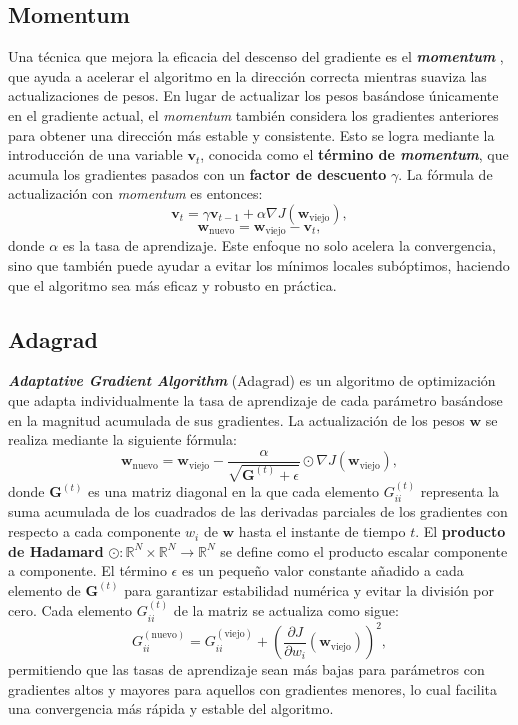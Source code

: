 \subsection{Momentum}

Una técnica que mejora la eficacia del descenso del gradiente es el \textbf{\textit{momentum}} \cite{rumelhart1986learning}, que ayuda a acelerar el algoritmo en la dirección correcta mientras suaviza las actualizaciones de pesos. En lugar de actualizar los pesos basándose únicamente en el gradiente actual, el \textit{momentum} también considera los gradientes anteriores para obtener una dirección más estable y consistente. Esto se logra mediante la introducción de una variable \(\mathbf{v}_t\), conocida como el \textbf{término de \textit{momentum}}, que acumula los gradientes pasados con un \textbf{factor de descuento} \(\gamma\). La fórmula de actualización con \textit{momentum} es entonces:
\begin{equation}
	\mathbf{v}_{t} = \gamma \mathbf{v}_{t-1} + \alpha \nabla J(\mathbf{w}_{\text{viejo}}),
\end{equation}
\begin{equation}
	\mathbf{w}_{\text{nuevo}} = \mathbf{w}_{\text{viejo}} - \mathbf{v}_{t},
\end{equation}
donde \(\alpha\) es la tasa de aprendizaje. Este enfoque no solo acelera la convergencia, sino que también puede ayudar a evitar los mínimos locales subóptimos, haciendo que el algoritmo sea más eficaz y robusto en práctica.


\subsection{Adagrad}

\textbf{\textit{Adaptative Gradient Algorithm}} (Adagrad) \cite{duchi2011adaptive} es un algoritmo de optimización que adapta individualmente la tasa de aprendizaje de cada parámetro basándose en la magnitud acumulada de sus gradientes. La actualización de los pesos \(\mathbf{w}\) se realiza mediante la siguiente fórmula:
\[
\mathbf{w}_{\text{nuevo}} = \mathbf{w}_{\text{viejo}} - \frac{\alpha}{\sqrt{\mathbf{G}^{(t)} + \epsilon}} \odot \nabla J(\mathbf{w}_{\text{viejo}}),
\]
donde \( \mathbf{G}^{(t)} \) es una matriz diagonal en la que cada elemento \( G_{ii}^{(t)} \) representa la suma acumulada de los cuadrados de las derivadas parciales de los gradientes con respecto a cada componente \( w_i \) de \(\mathbf{w}\) hasta el instante de tiempo \(t\). El \textbf{producto de Hadamard} \(\odot : \mathbb{R}^N \times \mathbb{R}^N \to \mathbb{R}^N\) se define como el producto escalar componente a componente. El término \( \epsilon \) es un pequeño valor constante añadido a cada elemento de \( \mathbf{G}^{(t)} \) para garantizar estabilidad numérica y evitar la división por cero. Cada elemento \( G_{ii}^{(t)} \) de la matriz se actualiza como sigue:
\[
G_{ii}^{(\text{nuevo})} = G_{ii}^{(\text{viejo})} + \left(\frac{\partial J}{\partial w_i} (\mathbf{w}_{\text{viejo}})\right)^2,
\]
permitiendo que las tasas de aprendizaje sean más bajas para parámetros con gradientes altos y mayores para aquellos con gradientes menores, lo cual facilita una convergencia más rápida y estable del algoritmo.

